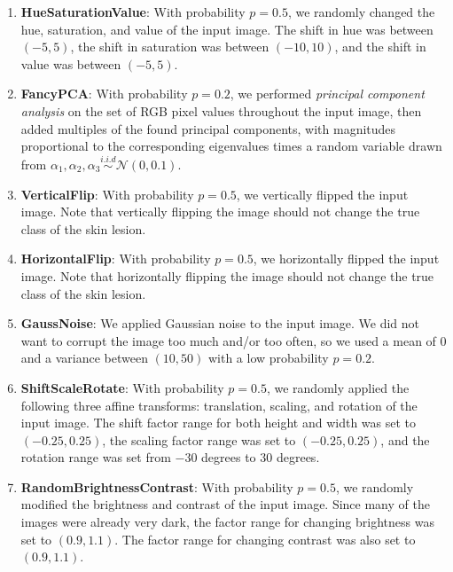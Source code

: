 \documentclass [MAS] {uclathes}
\begin{document}
\begin{enumerate}
    \item \textbf{HueSaturationValue}: With probability $p=0.5$, we randomly changed the hue, saturation, and value of the input image. The shift in hue was between $(-5, 5)$, the shift in saturation was between $(-10, 10)$, and the shift in value was between $(-5, 5)$.
    \item \textbf{FancyPCA}: With probability $p=0.2$, we performed \textit{principal component analysis} on the set of RGB pixel values throughout the input image, then added multiples of the found principal components, with magnitudes proportional to the corresponding eigenvalues times a random variable drawn from $\alpha_1, \alpha_2, \alpha_3 \stackrel{i.i.d}{\sim} \mathcal{N}(0, 0.1)$.
    \item \textbf{VerticalFlip}: With probability $p=0.5$, we vertically flipped the input image. Note that vertically flipping the image should not change the true class of the skin lesion.
    \item \textbf{HorizontalFlip}: With probability $p=0.5$, we horizontally flipped the input image. Note that horizontally flipping the image should not change the true class of the skin lesion.
    \item \textbf{GaussNoise}: We applied Gaussian noise to the input image. We did not want to corrupt the image too much and/or too often, so we used a mean of $0$ and a variance between $(10, 50)$ with a low probability $p=0.2$.
    \item \textbf{ShiftScaleRotate}: With probability $p=0.5$, we randomly applied the following three affine transforms: translation, scaling, and rotation of the input image. The shift factor range for both height and width was set to $(-0.25, 0.25)$, the scaling factor range was set to $(-0.25, 0.25)$, and the rotation range was set from $-30$ degrees to $30$ degrees. 
    \item \textbf{RandomBrightnessContrast}: With probability $p=0.5$, we randomly modified the brightness and contrast of the input image. Since many of the images were already very dark, the factor range for changing brightness was set to $(0.9, 1.1)$. The factor range for changing contrast was also set to $(0.9, 1.1)$.
\end{enumerate}
\end{document}
